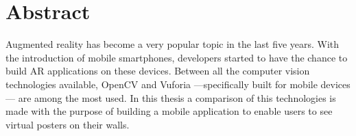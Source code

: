 \chapter{Abstract}
Augmented reality has become a very popular topic in the last five years. With
the introduction of mobile smartphones, developers started to have the chance
to build AR applications on these devices. Between all the computer vision
technologies available, OpenCV and Vuforia ---specifically built for mobile
devices--- are among the most used. In this thesis a comparison of this technologies
is made with the purpose of building a mobile application to enable users to see
virtual posters on their walls.
